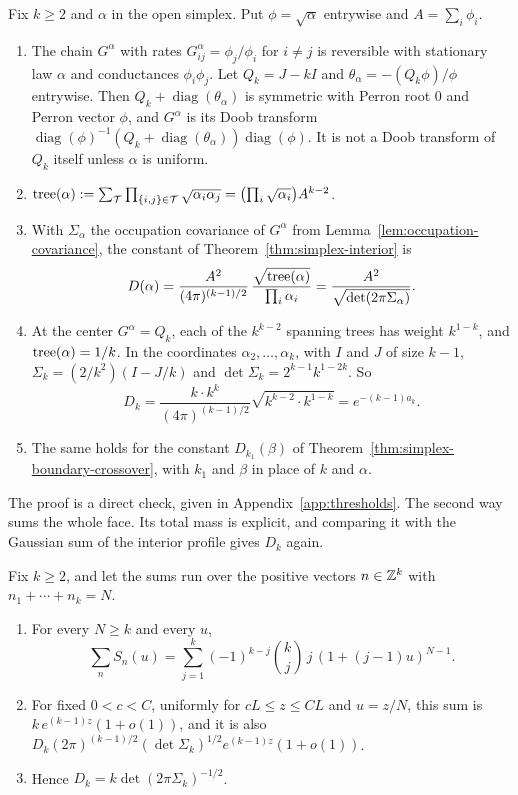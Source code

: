 \begin{proposition}\label{prop:kirchhoff}
Fix $k\ge2$ and $\alpha$ in the open simplex. Put $\phi=\sqrt\alpha$ entrywise
and $A=\sum_i\phi_i$.
\begin{enumerate}[(1)]
\item The chain $G^\alpha$ with rates $G^\alpha_{ij}=\phi_j/\phi_i$ for $i\ne j$
is reversible with stationary law $\alpha$ and conductances $\phi_i\phi_j$. Let
$Q_k=J-kI$ and $\theta_\alpha=-(Q_k\phi)/\phi$ entrywise. Then
$Q_k+\operatorname{diag}(\theta_\alpha)$ is symmetric with Perron root $0$ and
Perron vector $\phi$, and $G^\alpha$ is its Doob transform
$\operatorname{diag}(\phi)^{-1}(Q_k+\operatorname{diag}(\theta_\alpha))
\operatorname{diag}(\phi)$. It is not a Doob transform of $Q_k$ itself unless
$\alpha$ is uniform.
\item $\operatorname{tree}(\alpha):=\sum_{\mathcal T}\prod_{\{i,j\}\in\mathcal T}
\sqrt{\alpha_i\alpha_j}=\bigl(\prod_i\sqrt{\alpha_i}\bigr)A^{k-2}$.
\item With $\Sigma_\alpha$ the occupation covariance of $G^\alpha$ from
Lemma~\ref{lem:occupation-covariance}, the constant of
Theorem~\ref{thm:simplex-interior} is
\[
D(\alpha)=\frac{A^2}{(4\pi)^{(k-1)/2}}\,\frac{\sqrt{\operatorname{tree}(\alpha)}}{\prod_i\alpha_i}
=\frac{A^2}{\sqrt{\det(2\pi\Sigma_\alpha)}} .
\]
\item At the center $G^\alpha=Q_k$, each of the $k^{k-2}$ spanning trees has
weight $k^{1-k}$, and $\operatorname{tree}(\alpha)=1/k$. In the coordinates
$\alpha_2,\ldots,\alpha_k$, with $I$ and $J$ of size $k-1$,
$\Sigma_k=(2/k^2)(I-J/k)$ and
$\det\Sigma_k=2^{k-1}k^{1-2k}$. So
\[
D_k=\frac{k\cdot k^k}{(4\pi)^{(k-1)/2}}\sqrt{k^{k-2}\cdot k^{1-k}}=e^{-(k-1)a_k}.
\]
\item The same holds for the constant $D_{k_1}(\beta)$ of
Theorem~\ref{thm:simplex-boundary-crossover}, with $k_1$ and $\beta$ in place of
$k$ and $\alpha$.
\end{enumerate}
\end{proposition}

The proof is a direct check, given in Appendix~\ref{app:thresholds}. The second
way sums the whole face. Its total mass is explicit, and comparing it with the
Gaussian sum of the interior profile gives $D_k$ again.

\begin{proposition}\label{prop:mass-balance}
Fix $k\ge2$, and let the sums run over the positive vectors $n\in\mathbb Z^k$ with
$n_1+\cdots+n_k=N$.
\begin{enumerate}[(1)]
\item For every $N\ge k$ and every $u$,
\[
\sum_nS_n(u)=\sum_{j=1}^k(-1)^{k-j}\binom kj\,j\,(1+(j-1)u)^{N-1}.
\]
\item For fixed $0<c<C$, uniformly for $cL\le z\le CL$ and $u=z/N$, this sum is
$k\,e^{(k-1)z}(1+o(1))$, and it is also
$D_k(2\pi)^{(k-1)/2}(\det\Sigma_k)^{1/2}e^{(k-1)z}(1+o(1))$.
\item Hence $D_k=k\det(2\pi\Sigma_k)^{-1/2}$.
\end{enumerate}
\end{proposition}

